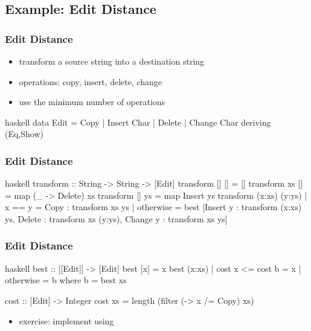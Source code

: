 \documentclass[dvipsnames]{beamer}
\theoremstyle{plain}
\begin{document}
\subsection{Example: Edit Distance}

\begin{frame}[fragile]
  \frametitle{Edit Distance}

  \begin{itemize}
    \item transform a source string into a destination string
    \item operations: copy, insert, delete, change
    \item use the minimum number of operations
  \end{itemize}

  \begin{exampleblock}{}
    \begin{pygments}{haskell}
data Edit = Copy | Insert Char | Delete | Change Char
            deriving (Eq,Show)
    \end{pygments}
  \end{exampleblock}
\end{frame}

\begin{frame}[fragile]
  \frametitle{Edit Distance}

  \begin{exampleblock}{}
    \begin{pygments}{haskell}
transform :: String -> String -> [Edit]
transform []     []     = []
transform xs     []     = map (\_ -> Delete) xs
transform []     ys     = map Insert ys
transform (x:xs) (y:ys)
  | x == y    = Copy : transform xs ys
  | otherwise = best [Insert y : transform (x:xs) ys,
                      Delete   : transform xs (y:ys),
                      Change y : transform xs ys]
    \end{pygments}
  \end{exampleblock}
\end{frame}

\begin{frame}[fragile]
  \frametitle{Edit Distance}

  \begin{exampleblock}{}
    \begin{pygments}{haskell}
best :: [[Edit]] -> [Edit]
best [x]    = x
best (x:xs)
  | cost x <= cost b = x
  | otherwise        = b
  where b = best xs

cost :: [Edit] -> Integer
cost xs = length (filter (\x -> x /= Copy) xs)
    \end{pygments}
  \end{exampleblock}

  \pause
  \begin{itemize}
    \item exercise: implement  using
  \end{itemize}
\end{frame}
\end{document}
